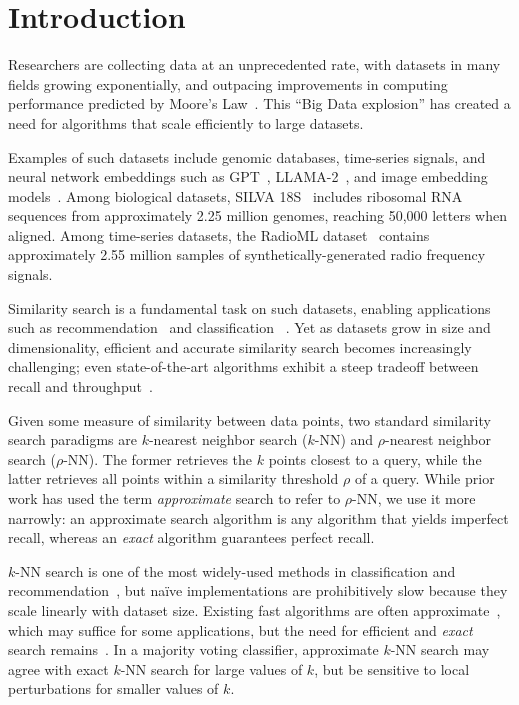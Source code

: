 \section{Introduction}
\label{sec:introduction}

Researchers are collecting data at an unprecedented rate, with datasets in many fields growing exponentially, and outpacing improvements in computing performance predicted by Moore's Law~\cite{kahn2011future}. This ``Big Data explosion'' has created a need for algorithms that scale efficiently to large datasets.

Examples of such datasets include genomic databases, time-series signals, and neural network embeddings such as GPT~\cite{2020arXiv200514165B, OpenAI2023GPT4TR}, LLAMA-2~\cite{Touvron2023Llama2O}, and image embedding models~\cite{radford2021learning, dosovitskiy2020image}.
Among biological datasets,  SILVA 18S~\cite{10.1093/nar/gks1219} includes ribosomal RNA sequences from approximately 2.25 million genomes, reaching 50,000 letters when aligned.
Among time-series datasets, the RadioML dataset~\cite{oshea2018radioml} contains approximately 2.55 million samples of synthetically-generated radio frequency signals.

Similarity search is a fundamental task on such datasets, enabling applications such as recommendation~\cite{annoy} and classification ~\cite{suyanto2022knnclassifier}.
Yet as datasets grow in size and dimensionality, efficient and accurate similarity search becomes increasingly challenging;
even state-of-the-art algorithms exhibit a steep tradeoff between recall and throughput~\cite{malkov2016hnsw, johnson2019billion, annoy, aumuller2020ann}.

Given some measure of similarity between data points, two standard similarity search paradigms are $k$-nearest neighbor search ($k$-NN) and $\rho$-nearest neighbor search ($\rho$-NN).
The former retrieves the $k$ points closest to a query, while the latter retrieves all points within a similarity threshold $\rho$ of a query.
While prior work has used the term \textit{approximate} search to refer to $\rho$-NN, we use it more narrowly: an {approximate} search algorithm is any algorithm that yields imperfect recall, whereas an \textit{exact} algorithm guarantees perfect recall.

$k$-NN search is one of the most widely-used methods in classification and recommendation~\cite{fix1952discriminatory, cover1967nearest}, but na\"{i}ve implementations are prohibitively slow because they scale linearly with dataset size.
Existing fast algorithms are often approximate~\cite{gao2023high}, which may suffice for some applications, but the need for efficient and \textit{exact} search remains~\cite{ukey2023survey}.
In a majority voting classifier, approximate $k$-NN search may agree with exact $k$-NN search for large values of $k$, but be sensitive to local perturbations for smaller values of $k$.

